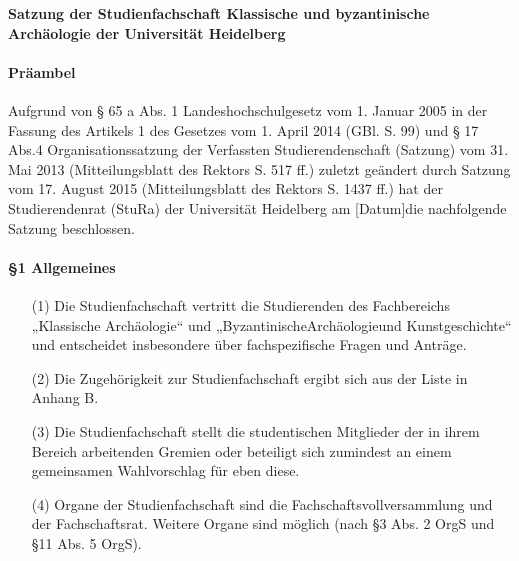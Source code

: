 {
    \textbf{Satzung  der  Studienfachschaft  Klassische  und  byzantinische  Archäologie  der Universität Heidelberg}
    \paragraph{Präambel}
    Aufgrund von § 65 a Abs. 1 Landeshochschulgesetz vom 1. Januar 2005 in der Fassung des Artikels 1 des Gesetzes vom 1. April 2014 (GBl. S. 99) und § 17 Abs.4 Organisationssatzung der Verfassten Studierendenschaft  (Satzung)  vom  31.  Mai  2013  (Mitteilungsblatt  des  Rektors  S.  517  ff.)  zuletzt geändert  durch  Satzung  vom  17.  August  2015  (Mitteilungsblatt  des  Rektors  S.  1437  ff.)  hat  der Studierendenrat  (StuRa)  der  Universität  Heidelberg  am [Datum]die  nachfolgende  Satzung beschlossen.
    \paragraph{§1 Allgemeines}
    \begin{enumerate}
        \item[(1)] Die Studienfachschaft    vertritt    die    Studierenden    des    Fachbereichs    „Klassische Archäologie“  und  „ByzantinischeArchäologieund  Kunstgeschichte“  und  entscheidet insbesondere über fachspezifische Fragen und Anträge.
        \item[(2)] Die Zugehörigkeit zur Studienfachschaft ergibt sich aus der Liste in Anhang B.
        \item[(3)] Die  Studienfachschaft  stellt  die  studentischen  Mitglieder  der  in  ihrem  Bereich  arbeitenden Gremien  oder  beteiligt  sich  zumindest  an  einem  gemeinsamen  Wahlvorschlag  für  eben diese.
        \item[(4)] Organe der Studienfachschaft sind die Fachschaftsvollversammlung und der Fachschaftsrat. Weitere Organe sind möglich (nach §3 Abs. 2 OrgS und §11 Abs. 5 OrgS).
    \end{enumerate}

}
